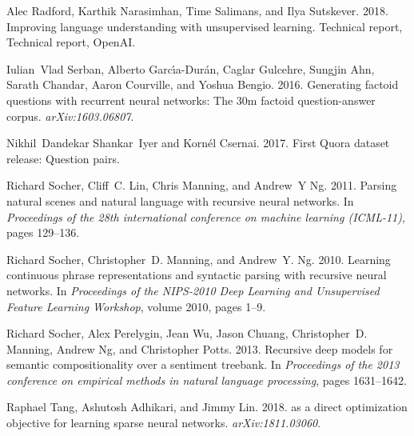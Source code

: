 \documentclass[11pt,a4paper]{article}
\begin{document}
\begin{thebibliography}{40}
Alec Radford, Karthik Narasimhan, Time Salimans, and Ilya Sutskever. 2018.
\newblock Improving language understanding with unsupervised learning.
\newblock Technical report, Technical report, OpenAI.

Iulian~Vlad Serban, Alberto Garc{\'\i}a-Dur{\'a}n, Caglar Gulcehre, Sungjin
  Ahn, Sarath Chandar, Aaron Courville, and Yoshua Bengio. 2016.
\newblock Generating factoid questions with recurrent neural networks: The 30m
  factoid question-answer corpus.
\newblock \emph{arXiv:1603.06807}.

Nikhil~Dandekar Shankar~Iyer and Kornél Csernai. 2017.
\newblock First {Quora} dataset release: Question pairs.

Richard Socher, Cliff~C. Lin, Chris Manning, and Andrew~Y Ng. 2011.
\newblock Parsing natural scenes and natural language with recursive neural
  networks.
\newblock In \emph{Proceedings of the 28th international conference on machine
  learning (ICML-11)}, pages 129--136.

Richard Socher, Christopher~D. Manning, and Andrew~Y. Ng. 2010.
\newblock Learning continuous phrase representations and syntactic parsing with
  recursive neural networks.
\newblock In \emph{Proceedings of the NIPS-2010 Deep Learning and Unsupervised
  Feature Learning Workshop}, volume 2010, pages 1--9.

Richard Socher, Alex Perelygin, Jean Wu, Jason Chuang, Christopher~D. Manning,
  Andrew Ng, and Christopher Potts. 2013.
\newblock Recursive deep models for semantic compositionality over a sentiment
  treebank.
\newblock In \emph{Proceedings of the 2013 conference on empirical methods in
  natural language processing}, pages 1631--1642.

Raphael Tang, Ashutosh Adhikari, and Jimmy Lin. 2018.
 as a direct optimization objective for learning sparse neural
  networks.
\newblock \emph{arXiv:1811.03060}.


\end{thebibliography}
\end{document}
